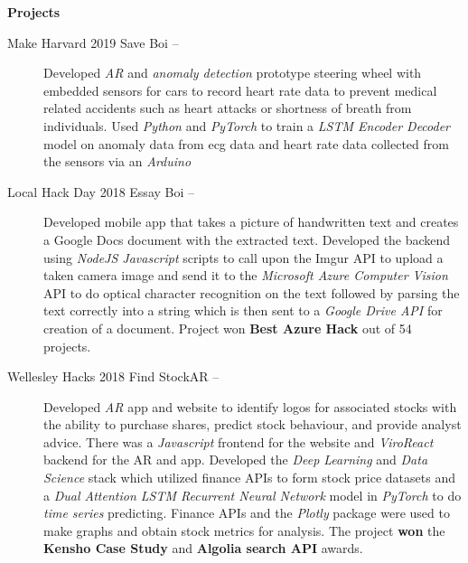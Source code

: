 \documentclass[letterpaper, 8pt]{extarticle}
\newcommand{\resheading}[1]{{\large \colorbox{mygrey}{\begin{minipage}{0.99\textwidth}{\textbf{#1 \vphantom{p\^{E}}}}\end{minipage}}}}
\begin{document}
\resheading{Projects}
\begin{description}
\item[Make Harvard 2019 Save Boi --] Developed \emph{AR} and \emph{anomaly detection} prototype steering wheel with embedded sensors for cars to record heart rate data to prevent medical related accidents such as heart attacks or shortness of breath from individuals. Used \emph{Python} and \emph{PyTorch} to train a \emph{LSTM Encoder Decoder} model on anomaly data from ecg data and heart rate data collected from the sensors via an \emph{Arduino}
\item[Local Hack Day 2018 Essay Boi --] Developed mobile app that takes a picture of handwritten text and creates a Google Docs document with the extracted text. Developed the backend using \emph{NodeJS Javascript} scripts to call upon the Imgur API to upload a taken camera image and send it to the \emph{Microsoft Azure Computer Vision} API to do optical character recognition on the text followed by parsing the text correctly into a string which is then sent to a \emph{Google Drive API} for creation of a document. Project won \textbf{Best Azure Hack} out of 54 projects.

\begin{comment}
\item[Boston Hacks 2018 Vetricle --] Developed social network meet up app and website for Veterans to use to connect to other veterans and do projects and activities together. \emph{Javascript}, \emph{ReactJS/Native}, and \emph{Google Firebase} are used to create the app and website. \emph{Collaborative Filtering} through \emph{Cosine distance} and a \emph{Neural autoencoder} is used to create a friend recommender system made in \emph{Python} and \emph{PyTorch}. 
\end{comment}

\item[Wellesley Hacks 2018 Find StockAR --]Developed \emph{AR} app and website to identify logos for associated stocks with the ability to purchase shares, predict stock behaviour, and provide analyst advice. There was a \emph{Javascript} frontend for the website and \emph{ViroReact} backend for the AR and app. Developed the \emph{Deep Learning} and \emph{Data Science} stack which utilized finance APIs to form stock price datasets and a \emph{Dual Attention LSTM Recurrent Neural Network} model in \emph{PyTorch} to do \emph{time series} predicting. Finance APIs and the \emph{Plotly} package were used to make graphs and obtain stock metrics for analysis. The project \textbf{won} the \textbf{Kensho Case Study} and \textbf{Algolia search API} awards.


\end{description}
\end{document}
